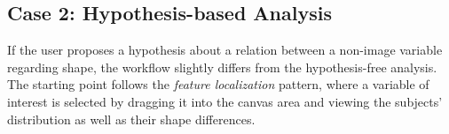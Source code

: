 \documentclass[journal]{style/vgtc} 			          %
\newcommand{\com}[1]{\textcolor{orange}{\uline{#1}}}
\begin{document}
\subsection{Case 2: Hypothesis-based Analysis}
If the user proposes a hypothesis about a relation between a non-image variable regarding shape, the workflow slightly differs from the hypothesis-free analysis.
%
The starting point follows the \emph{feature localization} pattern, where a variable of interest is selected by dragging it into the canvas area and viewing the subjects' distribution as well as their shape differences.
% 
\end{document}
